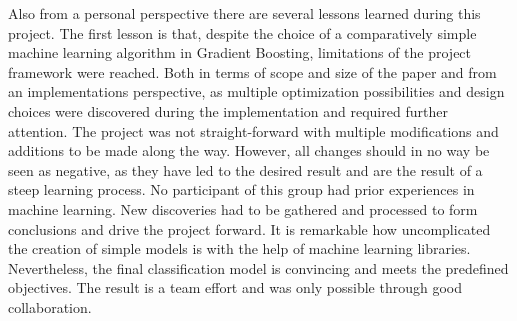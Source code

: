 
    Also from a personal perspective there are several lessons learned during this project. The first lesson is that, despite the choice of a comparatively simple 
    machine learning algorithm in Gradient Boosting, limitations of the project framework were reached. Both in terms of scope and size of the paper and from 
    an implementations perspective, as multiple optimization possibilities and design choices were discovered during the implementation and required further attention. The project
    was not straight-forward with multiple modifications and additions to be made along the way. However, all changes should in no way be seen as negative, 
    as they have led to the desired result and are the result of a steep learning process.
    No participant of this group had prior experiences in machine learning. New discoveries had to be gathered and processed to 
    form conclusions and drive the project forward. It is remarkable how uncomplicated the creation of simple models is with the help of machine learning libraries. 
    Nevertheless, the final classification model is convincing and meets the predefined objectives. The result is a team effort and was only possible through 
    good collaboration. 

